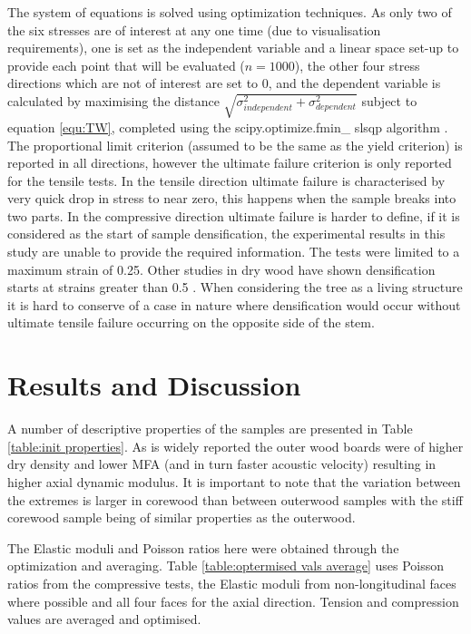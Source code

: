 \documentclass[10pt]{article}
\begin{document}
The system of equations is solved using optimization techniques. As only two of the six stresses are of interest at any one time
(due to visualisation requirements), one is set as the independent variable and a linear space set-up to provide each point that
will be evaluated (\(n=1000\)), the other four stress directions which are not of interest are set to 0, and the dependent variable
is calculated by maximising the distance \(\sqrt{\sigma_{independent}^2+\sigma_{dependent}^2}\) subject to equation \ref{equ:TW},
completed using the scipy.optimize.fmin\_ slsqp algorithm \citep{jones_scipy:_2001}.
The proportional limit criterion (assumed to be the same as the yield criterion) is reported in all directions, however the
ultimate failure criterion is only reported for the tensile tests. In the tensile direction ultimate failure is characterised
by very quick drop in stress to near zero, this happens when the sample breaks into two parts. In the compressive direction ultimate
failure is harder to define, if it is considered as the start of sample densification, the experimental results in this study are unable
to provide the required information. The tests were limited to a maximum strain of 0.25. Other studies in dry wood have shown densification
starts at strains greater than 0.5 \citep{gibson_l._ashby_cellular_1997}. When considering the tree as a living structure it is hard to
conserve of a case in nature where densification would occur without ultimate tensile failure occurring on the opposite side of the stem.


\section{Results and Discussion}

A number of descriptive properties of the samples are presented in Table \ref{table:init properties}.
As is widely reported the outer wood boards were of higher dry density and lower
MFA (and in turn faster acoustic velocity) resulting in higher axial dynamic
modulus. It is important to note that the variation between the extremes is
larger in corewood than between outerwood samples with the stiff corewood sample
being of similar properties as the outerwood.


The Elastic moduli and Poisson ratios here were obtained through the
optimization and averaging.
Table \ref{table:optermised vals average} uses Poisson ratios from the compressive tests, the Elastic moduli from non-longitudinal faces
where possible and all four faces for the axial direction. Tension and compression values are averaged and optimised.
\end{document}
